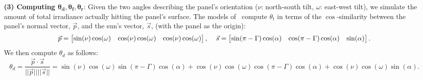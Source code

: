 \documentclass{article}
\begin{document}
{\bf (3) Computing $\pmb{\theta_d, \theta_f, \theta_r}$}: Given the two angles describing the panel's orientation ($\nu$: north-south tilt, $\omega$: east-west tilt), we simulate the amount of total irradiance actually hitting the panel's surface. The models of~\citet{masters2013renewable} compute $\theta_t$ in terms of the $\cos$-similarity between the panel's normal vector, $\vec{p}$, and the sun's vector, $\vec{s}$, (with the panel as the origin):
\begin{align}
\vec{p} = \begin{bmatrix} \sin(\nu)  \cos(\omega)& \cos(\nu)  \cos(\omega)& \cos(\nu) \cos(\omega) \end{bmatrix}, \hspace{4mm} \vec{s} = \begin{bmatrix} \sin(\pi - \Gamma)  \cos(\alpha)& \cos(\pi - \Gamma)  \cos(\alpha)& \sin(\alpha) \end{bmatrix}.
\end{align}
We then compute $\theta_d$ as follows:
\begin{equation}
\theta_d = \frac{\vec{p} \cdot \vec{s}}{||\vec{p}|| ||\vec{s} ||} = \sin(\nu)  \cos(\omega)  \sin(\pi - \Gamma)  \cos(\alpha) + \cos(\nu)  \cos(\omega)  \cos(\pi - \Gamma)  \cos(\alpha) +  \cos(\nu) \cos(\omega)  \sin(\alpha). 
\end{equation}
\end{document}
